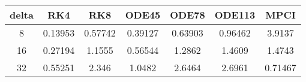 \begin{tabular}{ccccccc}
\hline
delta & RK4 & RK8 & ODE45 & ODE78 & ODE113 &MPCI\\ 
\hline 
8 & 0.13953 & 0.57742 & 0.39127 & 0.63903 & 0.96462 & 3.9137\\ 
16 & 0.27194 & 1.1555 & 0.56544 & 1.2862 & 1.4609 & 1.4743 \\ 
32 & 0.55251 & 2.346 & 1.0482 & 2.6464 & 2.6961 & 0.71467\\ 
\hline 
\end{tabular}
